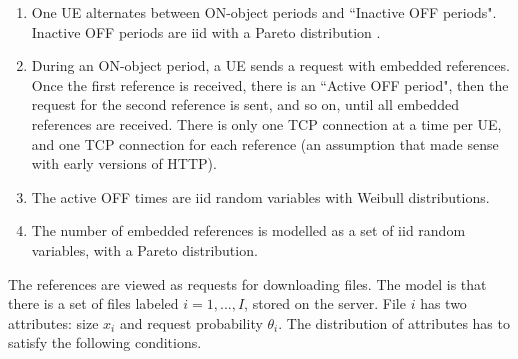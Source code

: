 \begin{enumerate}
  \item One UE alternates between ON-object periods and
      ``Inactive OFF periods". Inactive OFF periods are iid
      with a Pareto distribution .
  \item During an ON-object period, a UE sends a request
      with embedded references. Once the first reference
      is received, there is an ``Active OFF period",
      then the request for the second reference is sent,
      and so on, until all embedded references are
      received. There is only one TCP connection at a time
      per UE, and one TCP connection for each reference (an
      assumption that made sense with early versions of
      HTTP).
  \item The active OFF times are iid random
      variables with Weibull distributions.
  \item The number of embedded references is modelled as a
      set of iid random variables, with a Pareto
      distribution.
  \setcounter{compt-klsadklsda88}{\value{enumi}}
\end{enumerate}

The references are viewed as requests for
downloading files. The model is that there is a
set of files labeled $i=1,...,I$, stored on the
server. File $i$ has two attributes: size $x_i$
and request probability $\theta_i$. The
distribution of attributes has to satisfy the
following conditions.

